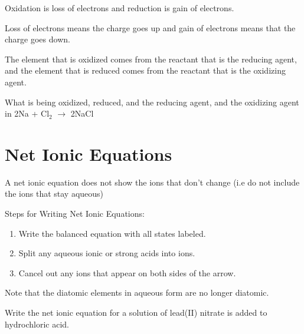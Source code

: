 \documentclass[../hchem.tex]{subfiles}
\begin{document}
Oxidation is loss of electrons and reduction is gain of electrons. 

Loss of electrons means the charge goes up and gain of electrons means that the charge goes down.

The element that is oxidized comes from the reactant that is the reducing agent, and the element that is reduced 
comes from the reactant that is the oxidizing agent.

\ex What is being oxidized, reduced, and the reducing agent, and the oxidizing agent in 2Na + Cl$_2$ $\rightarrow$ 2NaCl 
\section{Net Ionic Equations}
A net ionic equation does not show the ions that don't change (i.e do not include the ions that stay aqueous)

Steps for Writing Net Ionic Equations:
\begin{enumerate}
    \item Write the balanced equation with all states labeled. 
    \item Split any aqueous ionic or strong acids into ions.
    \item Cancel out any ions that appear on both sides of the arrow.
\end{enumerate}

Note that the diatomic elements in aqueous form are no longer diatomic.

\ex Write the net ionic equation for a solution of lead(II) nitrate is added to hydrochloric acid. 
\end{document}
